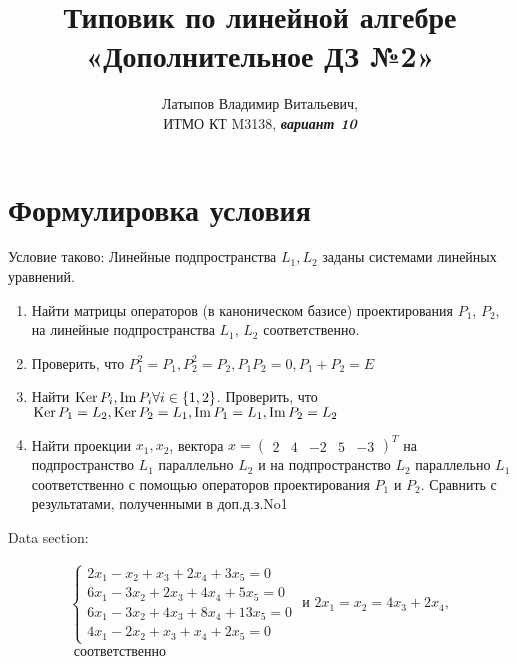 \documentclass[12pt, a4paper]{article}
\author{Латыпов Владимир Витальевич, \\ ИТМО КТ M3138, \Huge{\textit{\textbf{вариант 10}}}}
\title{Типовик по линейной алгебре «Дополнительное ДЗ №2»}
\begin{document}
    \tit

    \section{Формулировка условия}

    \begin{statement}
        Условие таково: 
        Линейные подпространства $L_1, L_2$ заданы системами линейных уравнений.
        
        \begin{enumerate}
            \item Найти матрицы операторов (в каноническом базисе) проектирования $P_1$, $P_2$, на линейные подпространства $L_1$, $L_2$ соответственно.
            \item Проверить, что $P_1^2 = P_1, P_2^2 = P_2, P_1P_2 = 0, P_1 + P_2 = E$
            \item Найти $\operatorname{Ker} P_i, \operatorname{Im} P_i \forall i \in \{ 1, 2 \}$. 
            Проверить, что $\operatorname{Ker} P_1 = L_2, \operatorname{Ker} P_2 = L_1, \operatorname{Im} P_1 = L_1, \operatorname{Im} P_2 = L_2$
            \item Найти проекции $x_1, x_2$, вектора $x = \begin{pmatrix}
                2 & 4 & -2 & 5 & -3
            \end{pmatrix}^T$ на подпространство $L_1$ параллельно $L_2$ 
            и на подпространство $L_2$ параллельно $L_1$ соответственно 
            с помощью операторов проектирования $P_1$ и $P_2$.
            Сравнить с результатами, полученными в доп.д.з.No1
        \end{enumerate}

        Data section:

        \begin{multline}
            \left\{\begin{array}{l}
                2 x_{1}-x_{2}+x_{3}+2 x_{4}+3 x_{5}=0 \\
                6 x_{1}-3 x_{2}+2 x_{3}+4 x_{4}+5 x_{5}=0 \\
                6 x_{1}-3 x_{2}+4 x_{3}+8 x_{4}+13 x_{5}=0 \\
                4 x_{1}-2 x_{2}+x_{3}+x_{4}+2 x_{5}=0
            \end{array}
            \text { и }
            2 x_{1}=x_{2}=4 x_{3}+2 x_{4},\right. \\ \text { соответственно }
        \end{multline}
    \end{statement}
\end{document}
